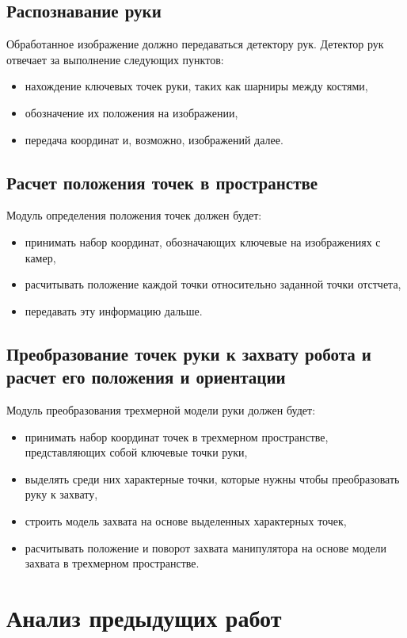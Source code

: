\documentclass[12pt, a4paper]{article}
\begin{document}
\subsection{Распознавание руки}
Обработанное изображение должно передаваться детектору рук. Детектор рук отвечает за выполнение следующих пунктов:
\begin{itemize}
    \item нахождение ключевых точек руки, таких как шарниры между костями,
    \item обозначение их положения на изображении,
    \item передача координат и, возможно, изображений далее.
\end{itemize}   

\subsection{Расчет положения точек в пространстве}
Модуль определения положения точек должен будет:
\begin{itemize}
    \item принимать набор координат, обозначающих ключевые на изображениях с камер,
    \item расчитывать положение каждой точки относительно заданной точки отстчета,
    \item передавать эту информацию дальше.
\end{itemize}

\subsection{Преобразование точек руки к захвату робота и расчет его положения и ориентации}
Модуль преобразования трехмерной модели руки должен будет:
\begin{itemize}
    \item принимать набор координат точек в трехмерном пространстве, представляющих собой ключевые точки руки,
    \item выделять среди них характерные точки, которые нужны чтобы преобразовать руку к захвату,
    \item строить модель захвата на основе выделенных характерных точек,
    \item расчитывать положение и поворот захвата манипулятора на основе модели захвата в трехмерном пространстве.
\end{itemize}


\section{Анализ предыдущих работ}
\end{document}
